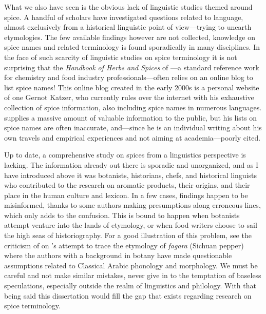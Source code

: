 What we also have seen is the obvious lack of linguistic studies themed around spice. A handful of scholars have investigated questions related to language, almost exclusively from a historical linguistic point of view---trying to unearth etymologies. The few available findings however are not collected, knowledge on spice names and related terminology is found sporadically in many disciplines. In the face of such scarcity of linguistic studies on spice terminology it is not surprising that the \textit{Handbook of Herbs and Spices} of \textcite{peter_handbook_2012}---a standard reference work for chemistry and food industry professionals---often relies on an online blog to list spice names! This online blog created in the early 2000s is a personal website of one Gernot Katzer, who currently rules over the internet with his exhaustive collection of spice information, also including spice names in numerous languages. \textcite{katzer_welcome_2012} supplies a massive amount of valuable information to the public, but his lists on spice names are often inaccurate, and---since he is an individual writing about his own travels and empirical experiences and not aiming at academia---poorly cited.

Up to date, a comprehensive study on spices from a linguistics perspective is lacking. The information already out there is sporadic and unorganized, and as I have introduced above it was botanists, historians, chefs, and historical linguists who contributed to the research on aromatic products, their origins, and their place in the human culture and lexicon. In a few cases, findings happen to be misinformed, thanks to some authors making presumptions along erroneous lines, which only adds to the confusion. This is bound to happen when botanists attempt venture into the lands of etymology, or when food writers choose to sail the high seas of historiography. For a good illustration of this problem, see the criticism of \textcite{haw_cinnamon_2017} on \textcite{austin_sichuan_2008}'s attempt to trace the etymology of \textit{fagara} (Sichuan pepper) where the authors with a background in botany have made questionable assumptions related to Classical Arabic phonology and morphology. We must be careful and not make similar mistakes, never give in to the temptation of baseless speculations, especially outside the realm of linguistics and philology. With that being said this dissertation would fill the gap that exists regarding research on spice terminology. 


